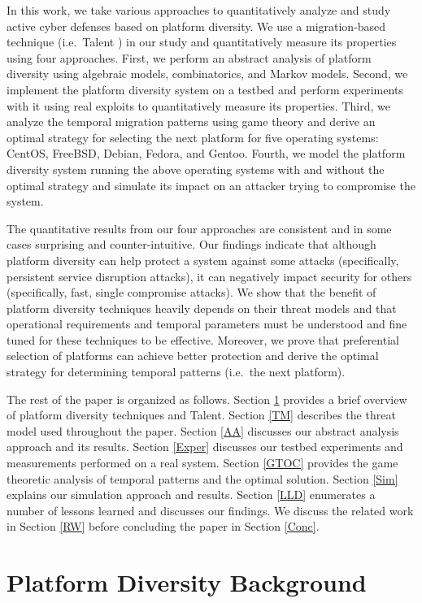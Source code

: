 \documentclass{acm_proc_article-sp}
\begin{document}
In this work, we take various approaches to quantitatively analyze and study active cyber defenses based on platform diversity. We use a migration-based technique (i.e.~Talent \cite{talent}) in our study and quantitatively measure its properties using four approaches. First, we perform an abstract analysis of platform diversity using algebraic models, combinatorics, and Markov models. Second, we implement the platform diversity system on a testbed and perform experiments with it using real exploits to quantitatively measure its properties. Third, we analyze the temporal migration patterns using game theory and derive an optimal strategy for selecting the next platform for five operating systems: CentOS, FreeBSD, Debian, Fedora, and Gentoo. Fourth, we model the platform diversity system running the above operating systems with and without the optimal strategy and simulate its impact on an attacker trying to compromise the system.

The quantitative results from our four approaches are consistent and in some cases surprising and counter-intuitive. Our findings indicate that although platform diversity can help protect a system against some attacks (specifically, persistent service disruption attacks), it can negatively impact security for others (specifically, fast, single compromise attacks). We show that the benefit of platform diversity techniques heavily depends on their threat models and that operational requirements and temporal parameters must be understood and fine tuned for these techniques to be effective. Moreover, we prove that preferential selection of platforms can achieve better protection and derive the optimal strategy for determining temporal patterns (i.e.~the next platform).

The rest of the paper is organized as follows. Section \ref{PDB} provides a brief overview of platform diversity techniques and Talent. Section \ref{TM} describes the threat model used throughout the paper. Section \ref{AA} discusses our abstract analysis approach and its results. Section \ref{Exper} discusses our testbed experiments and measurements performed on a real system. Section \ref{GTOC} provides the game theoretic analysis of temporal patterns and the optimal solution. Section \ref{Sim} explains our simulation approach and results. Section \ref{LLD} enumerates a number of lessons learned and discusses our findings. We discuss the related work in Section \ref{RW} before concluding the paper in Section \ref{Conc}.


\section{Platform Diversity Background}
\label{PDB}
\end{document}

